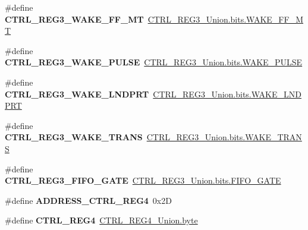 \begin{DoxyCompactItemize}
\item 
\hypertarget{group__accel__module_gad59dac296c20eeb94373ce9c016fbf87}{}\#define {\bfseries C\+T\+R\+L\+\_\+\+R\+E\+G3\+\_\+\+W\+A\+K\+E\+\_\+\+F\+F\+\_\+\+M\+T}~\hyperlink{accel_8c_a5a9cd1fabb67e7b23131b09b74a3aef8}{C\+T\+R\+L\+\_\+\+R\+E\+G3\+\_\+\+Union.\+bits.\+W\+A\+K\+E\+\_\+\+F\+F\+\_\+\+M\+T}\label{group__accel__module_gad59dac296c20eeb94373ce9c016fbf87}

\item 
\hypertarget{group__accel__module_ga70780e1bb0a043940b319c7d0e809f16}{}\#define {\bfseries C\+T\+R\+L\+\_\+\+R\+E\+G3\+\_\+\+W\+A\+K\+E\+\_\+\+P\+U\+L\+S\+E}~\hyperlink{accel_8c_ab6632b49510fcd5fc7311f878fcbbe14}{C\+T\+R\+L\+\_\+\+R\+E\+G3\+\_\+\+Union.\+bits.\+W\+A\+K\+E\+\_\+\+P\+U\+L\+S\+E}\label{group__accel__module_ga70780e1bb0a043940b319c7d0e809f16}

\item 
\hypertarget{group__accel__module_ga4aa9823c93b607b9782b48b6237cfb9b}{}\#define {\bfseries C\+T\+R\+L\+\_\+\+R\+E\+G3\+\_\+\+W\+A\+K\+E\+\_\+\+L\+N\+D\+P\+R\+T}~\hyperlink{accel_8c_a700b70ff2aabdb4141620f413d8bd1d1}{C\+T\+R\+L\+\_\+\+R\+E\+G3\+\_\+\+Union.\+bits.\+W\+A\+K\+E\+\_\+\+L\+N\+D\+P\+R\+T}\label{group__accel__module_ga4aa9823c93b607b9782b48b6237cfb9b}

\item 
\hypertarget{group__accel__module_gae7d829220491dc28782fabd56ca80870}{}\#define {\bfseries C\+T\+R\+L\+\_\+\+R\+E\+G3\+\_\+\+W\+A\+K\+E\+\_\+\+T\+R\+A\+N\+S}~\hyperlink{accel_8c_a3ed14f173e1a48868fbda54e270c303d}{C\+T\+R\+L\+\_\+\+R\+E\+G3\+\_\+\+Union.\+bits.\+W\+A\+K\+E\+\_\+\+T\+R\+A\+N\+S}\label{group__accel__module_gae7d829220491dc28782fabd56ca80870}

\item 
\hypertarget{group__accel__module_ga0cc835348915582c6f7a39d546d739d4}{}\#define {\bfseries C\+T\+R\+L\+\_\+\+R\+E\+G3\+\_\+\+F\+I\+F\+O\+\_\+\+G\+A\+T\+E}~\hyperlink{accel_8c_a22ea01efb74f287ca51a6d0b6552e920}{C\+T\+R\+L\+\_\+\+R\+E\+G3\+\_\+\+Union.\+bits.\+F\+I\+F\+O\+\_\+\+G\+A\+T\+E}\label{group__accel__module_ga0cc835348915582c6f7a39d546d739d4}

\item 
\hypertarget{group__accel__module_gadc3d98ee18479004290f6cc9966b3509}{}\#define {\bfseries A\+D\+D\+R\+E\+S\+S\+\_\+\+C\+T\+R\+L\+\_\+\+R\+E\+G4}~0x2\+D\label{group__accel__module_gadc3d98ee18479004290f6cc9966b3509}

\item 
\hypertarget{group__accel__module_ga36c532b0a660c101907dcad7ee399fbd}{}\#define {\bfseries C\+T\+R\+L\+\_\+\+R\+E\+G4}~\hyperlink{accel_8c_a96f44d20f1dbf1c8785a7bc99a46164c}{C\+T\+R\+L\+\_\+\+R\+E\+G4\+\_\+\+Union.\+byte}\label{group__accel__module_ga36c532b0a660c101907dcad7ee399fbd}


\end{DoxyCompactItemize}
